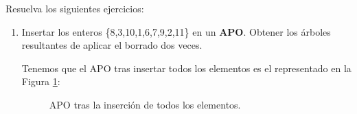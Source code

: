 \begin{ejercicio}
    Resuelva los siguientes ejercicios:
    \begin{enumerate}
        \item Insertar los enteros \{8,3,10,1,6,7,9,2,11\} en un \textbf{APO}. Obtener los árboles resultantes de aplicar el borrado dos veces.

        Tenemos que el APO tras insertar todos los elementos es el representado en la Figura \ref{fig:APO_Inicial}:
        \begin{figure}[H]
            \centering
            \caption{APO tras la inserción de todos los elementos.}
            \label{fig:APO_Inicial}
        \end{figure}



\end{enumerate}
\end{ejercicio}
